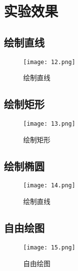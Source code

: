 \documentclass[14pt]{scrartcl} %
\begin{document}
\pagebreak


\section{实验效果}

\subsection{绘制直线}

\begin{figure}[h] %
	\centering
	\texttt{[image: 12.png]} %
	\caption{绘制直线}
\end{figure}

\subsection{绘制矩形}

\begin{figure}[h] %
	\centering
	\texttt{[image: 13.png]} %
	\caption{绘制矩形}
\end{figure}


\pagebreak
\subsection{绘制椭圆}

\begin{figure}[h] %
	\centering
	\texttt{[image: 14.png]} %
	\caption{绘制直线}
\end{figure}

\subsection{自由绘图}

\begin{figure}[h] %
	\centering
	\texttt{[image: 15.png]} %
	\caption{自由绘图}
\end{figure}

\pagebreak
\end{document}
